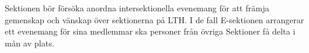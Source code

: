 \documentclass[10pt]{article}
\begin{document}
\section*{\doctitle}

Sektionen bör försöka anordna intersektionella evenemang för att främja gemenskap och vänskap över sektionerna på LTH. I de fall E-sektionen arrangerar ett evenemang för sina medlemmar ska personer från övriga Sektioner få delta i mån av plats.
\end{document}
